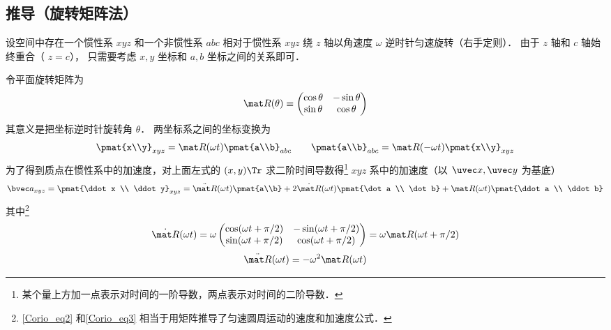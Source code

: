 \subsection{推导（旋转矩阵法）}
设空间中存在一个惯性系 $xyz$ 和一个非惯性系 $abc$ 相对于惯性系 $xyz$ 绕 $z$ 轴以角速度 $\omega$ 逆时针匀速旋转（右手定则）． 由于 $z$ 轴和 $c$ 轴始终重合（ $z=c$）， 只需要考虑 $x,y$ 坐标和 $a,b$ 坐标之间的关系即可．

令平面旋转矩阵为%
\begin{equation}
\mat R(\theta) \equiv \begin{pmatrix}
\cos \theta & - \sin \theta \\
\sin \theta & \cos \theta
\end{pmatrix}
\end{equation}
其意义是把坐标逆时针旋转角 $\theta$． 两坐标系之间的坐标变换为
\begin{equation}
\pmat{x\\y}_{xyz} = \mat R(\omega t) \pmat{a\\b}_{abc}
\qquad
\pmat{a\\b}_{abc} = \mat R(-\omega t) \pmat{x\\y}_{xyz}
\end{equation}
为了得到质点在惯性系中的加速度，对上面左式的 $(x,y)\Tr$ 求二阶时间导数得\footnote{某个量上方加一点表示对时间的一阶导数，两点表示对时间的二阶导数．} $xyz$ 系中的加速度（以 $\uvec x, \uvec y$ 为基底）
\begin{equation}\label{Corio_eq1}
\bvec a_{xyz} = \pmat{\ddot x \\ \ddot y}_{xyz} = 
\ddot{\mat R}(\omega t) \pmat{a\\b} + 2\dot{\mat R} (\omega t) \pmat{\dot a \\ \dot b} + \mat R(\omega t)\pmat{\ddot a \\ \ddot b}
\end{equation}
其中\footnote{\autoref{Corio_eq2} 和\autoref{Corio_eq3} 相当于用矩阵推导了匀速圆周运动的速度和加速度公式．}
\begin{equation}\label{Corio_eq2}
\dot{\mat R}(\omega t) = \omega \begin{pmatrix}
\cos(\omega t + \pi /2) &  - \sin(\omega t + \pi /2)\\
\sin(\omega t + \pi /2) & \cos(\omega t + \pi /2)
\end{pmatrix}
= \omega \mat R(\omega t + \pi /2)
\end{equation}
\begin{equation}\label{Corio_eq3}
\ddot{\mat R} (\omega t)  =  - \omega ^2 \mat R (\omega t)
\end{equation}
